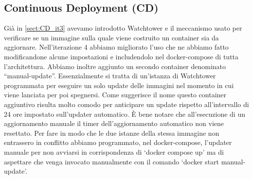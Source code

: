 \subsection{Continuous Deployment (CD)}
\label{subsect:CD_it2}
Già in \ref{sect:CD_it3} avevamo introdotto Watchtower e il meccanismo usato per verificare se un immagine sulla quale viene costruito un container sia da aggiornare. Nell'iterazione 4 abbiamo migliorato l'uso che ne abbiamo fatto modificandone alcune impostazioni e includendolo nel docker-compose di tutta l'architettura. Abbiamo inoltre aggiunto un secondo container denominato ``manual-update''. Essenzialmente si tratta di un'istanza di Watchtower programmata per eseguire un solo update delle immagini nel momento in cui viene lanciata per poi spegnersi. Come suggerisce il nome questo container aggiuntivo risulta molto comodo per anticipare un update rispetto all'intervallo di 24 ore impostato sull'updater automatico. È bene notare che all'esecuzione di un aggiornamento manuale il timer dell'aggiornamento automatico non viene resettato. Per fare in modo che le due istanze della stessa immagine non entrassero in conflitto abbiamo programmato, nel docker-compose, l'updater manuale per non avviarsi in corrispondenza di `docker compose up' ma di aspettare che venga invocato manualmente con il comando `docker start manual-update'.